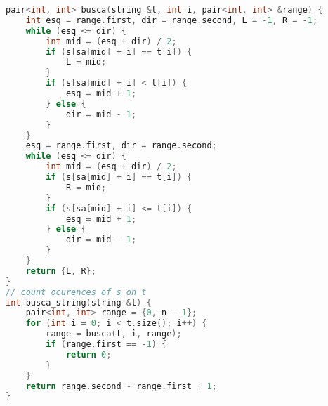 \documentclass[11pt, a4paper, oneside]{book}
\begin{document}
\begin{multicols}{2}
\begin{lstlisting}[language=C++]
pair<int, int> busca(string &t, int i, pair<int, int> &range) {
    int esq = range.first, dir = range.second, L = -1, R = -1;
    while (esq <= dir) {
        int mid = (esq + dir) / 2;
        if (s[sa[mid] + i] == t[i]) {
            L = mid;
        }
        if (s[sa[mid] + i] < t[i]) {
            esq = mid + 1;
        } else {
            dir = mid - 1;
        }
    }
    esq = range.first, dir = range.second;
    while (esq <= dir) {
        int mid = (esq + dir) / 2;
        if (s[sa[mid] + i] == t[i]) {
            R = mid;
        }
        if (s[sa[mid] + i] <= t[i]) {
            esq = mid + 1;
        } else {
            dir = mid - 1;
        }
    }
    return {L, R};
}
// count ocurences of s on t
int busca_string(string &t) {
    pair<int, int> range = {0, n - 1};
    for (int i = 0; i < t.size(); i++) {
        range = busca(t, i, range);
        if (range.first == -1) {
            return 0;
        }
    }
    return range.second - range.first + 1;
}\end{lstlisting}
\end{multicols}

\hfill
\end{document}
